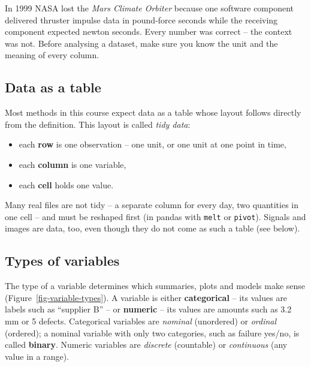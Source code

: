 \documentclass[
  letterpaper,
  DIV=11,
  numbers=noendperiod]{scrreprt}
\providecommand{\tightlist}{%
  \setlength{\itemsep}{0pt}\setlength{\parskip}{0pt}}\usepackage{longtable,booktabs,array}
\begin{document}
\begin{tcolorbox}[enhanced jigsaw, left=2mm, title=\textcolor{quarto-callout-warning-color}{\faExclamationTriangle}\hspace{0.5em}{Pitfall: numbers without context}, opacityback=0, breakable, rightrule=.15mm, arc=.35mm, toptitle=1mm, colbacktitle=quarto-callout-warning-color!10!white, opacitybacktitle=0.6, coltitle=black, colframe=quarto-callout-warning-color-frame, bottomrule=.15mm, leftrule=.75mm, bottomtitle=1mm, titlerule=0mm, toprule=.15mm, colback=white]

In 1999 NASA lost the \emph{Mars Climate Orbiter} because one software
component delivered thruster impulse data in pound-force seconds while
the receiving component expected newton seconds. Every number was
correct -- the context was not. Before analysing a dataset, make sure
you know the unit and the meaning of every column.

\end{tcolorbox}

\subsection{Data as a table}\label{data-as-a-table}

Most methods in this course expect data as a table whose layout follows
directly from the definition. This layout is called \emph{tidy data}:

\begin{itemize}
\tightlist
\item
  each \textbf{row} is one observation -- one unit, or one unit at one
  point in time,
\item
  each \textbf{column} is one variable,
\item
  each \textbf{cell} holds one value.
\end{itemize}

Many real files are not tidy -- a separate column for every day, two
quantities in one cell -- and must be reshaped first (in pandas with
\texttt{melt} or \texttt{pivot}). Signals and images are data, too, even
though they do not come as such a table (see below).

\subsection{Types of variables}\label{types-of-variables}

The type of a variable determines which summaries, plots and models make
sense (Figure~\ref{fig-variable-types}). A variable is either
\textbf{categorical} -- its values are labels such as ``supplier B'' --
or \textbf{numeric} -- its values are amounts such as 3.2 mm or 5
defects. Categorical variables are \emph{nominal} (unordered) or
\emph{ordinal} (ordered); a nominal variable with only two categories,
such as failure yes/no, is called \textbf{binary}. Numeric variables are
\emph{discrete} (countable) or \emph{continuous} (any value in a range).
\end{document}
